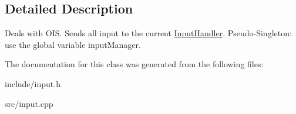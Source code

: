 \subsection{\-Detailed \-Description}
\-Deals with \-O\-I\-S. \-Sends all input to the current \hyperlink{classInputHandler}{\-Input\-Handler}. \-Pseudo-\/\-Singleton\-: use the global variable input\-Manager. 

\-The documentation for this class was generated from the following files\-:\begin{DoxyCompactItemize}
\item 
include/input.\-h\item 
src/input.\-cpp\end{DoxyCompactItemize}
